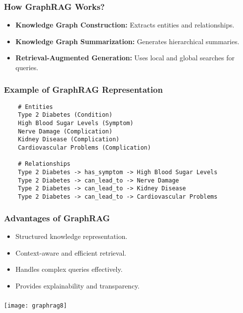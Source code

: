 \begin{frame}[fragile]\frametitle{How GraphRAG Works?}
    \begin{itemize}
        \item \textbf{Knowledge Graph Construction:} Extracts entities and relationships.
        \item \textbf{Knowledge Graph Summarization:} Generates hierarchical summaries.
        \item \textbf{Retrieval-Augmented Generation:} Uses local and global searches for queries.
    \end{itemize}
\end{frame}

\begin{frame}[fragile]\frametitle{Example of GraphRAG Representation}
    \begin{lstlisting}
    # Entities
    Type 2 Diabetes (Condition)
    High Blood Sugar Levels (Symptom)
    Nerve Damage (Complication)
    Kidney Disease (Complication)
    Cardiovascular Problems (Complication)

    # Relationships
    Type 2 Diabetes -> has_symptom -> High Blood Sugar Levels
    Type 2 Diabetes -> can_lead_to -> Nerve Damage
    Type 2 Diabetes -> can_lead_to -> Kidney Disease
    Type 2 Diabetes -> can_lead_to -> Cardiovascular Problems
    \end{lstlisting}
\end{frame}


\begin{frame}[fragile]\frametitle{Advantages of GraphRAG}
    \begin{itemize}
        \item Structured knowledge representation.
        \item Context-aware and efficient retrieval.
        \item Handles complex queries effectively.
        \item Provides explainability and transparency.
    \end{itemize}
\end{frame}

\begin{frame}[fragile]\frametitle{}

	\begin{center}
	\texttt{[image: graphrag8]}
	\end{center}
	
\end{frame}


